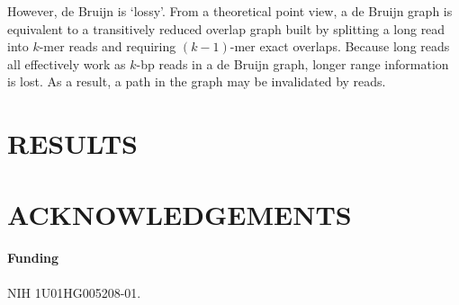 \documentclass{bioinfo}
\begin{document}
\begin{methods}
However, de Bruijn is `lossy'. From a theoretical point view, a de Bruijn graph
is equivalent to a transitively reduced overlap graph built by splitting a long
read into $k$-mer reads and requiring $(k-1)$-mer exact overlaps. Because
long reads all effectively work as $k$-bp reads in a de Bruijn graph, longer
range information is lost. As a result, a path in the graph may be invalidated
by reads.

\end{methods}

\section{RESULTS}

\section*{ACKNOWLEDGEMENTS}

\paragraph{Funding\textcolon} NIH 1U01HG005208-01.

\end{document}
